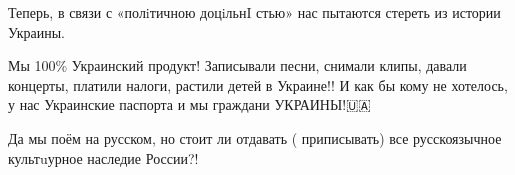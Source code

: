 Теперь, в связи с «полiтичною доцiльнI стью» нас пытаются стереть  из истории Украины.

Мы 100\% Украинский продукт! Записывали песни, снимали клипы, давали концерты,
платили налоги, растили детей в Украине!! И как бы кому не хотелось, у нас
Украинские паспорта и мы граждани УКРАИНЫ!🇺🇦

Да мы поём на русском, но стоит ли отдавать ( приписывать) все русскоязычное
культuурное наследие России?!


